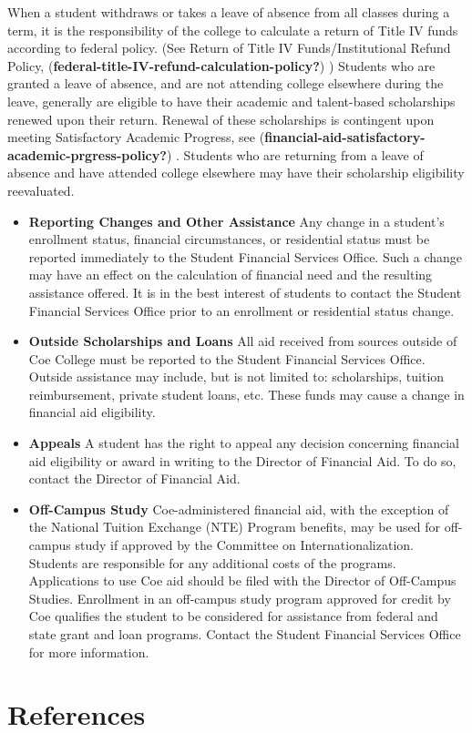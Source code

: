 \documentclass[
  letterpaper,
]{scrbook}
\newlength{\cslhangindent}
\newlength{\cslentryspacingunit} %
\newenvironment{CSLReferences}[2] %
 {%
  \setlength{\parindent}{0pt}
  \ifodd #1
  \let\oldpar\par
  \def\par{\hangindent=\cslhangindent\oldpar}
  \fi
  \setlength{\parskip}{#2\cslentryspacingunit}
 }%
 {}
\begin{document}
When a student withdraws or takes a leave of absence from all classes
during a term, it is the responsibility of the college to calculate a
return of Title IV funds according to federal policy. (See Return of
Title IV Funds/Institutional Refund Policy,
(\textbf{federal-title-IV-refund-calculation-policy?}) ) Students who
are granted a leave of absence, and are not attending college elsewhere
during the leave, generally are eligible to have their academic and
talent-based scholarships renewed upon their return. Renewal of these
scholarships is contingent upon meeting Satisfactory Academic Progress,
see (\textbf{financial-aid-satisfactory-academic-prgress-policy?}) .
Students who are returning from a leave of absence and have attended
college elsewhere may have their scholarship eligibility reevaluated.

\begin{itemize}
\item
  \textbf{Reporting Changes and Other Assistance} Any change in a
  student's enrollment status, financial circumstances, or residential
  status must be reported immediately to the Student Financial Services
  Office. Such a change may have an effect on the calculation of
  financial need and the resulting assistance offered. It is in the best
  interest of students to contact the Student Financial Services Office
  prior to an enrollment or residential status change.
\item
  \textbf{Outside Scholarships and Loans} All aid received from sources
  outside of Coe College must be reported to the Student Financial
  Services Office. Outside assistance may include, but is not limited
  to: scholarships, tuition reimbursement, private student loans, etc.
  These funds may cause a change in financial aid eligibility.
\item
  \textbf{Appeals} A student has the right to appeal any decision
  concerning financial aid eligibility or award in writing to the
  Director of Financial Aid. To do so, contact the Director of Financial
  Aid.
\item
  \textbf{Off-Campus Study} Coe-administered financial aid, with the
  exception of the National Tuition Exchange (NTE) Program benefits, may
  be used for off-campus study if approved by the Committee on
  Internationalization. Students are responsible for any additional
  costs of the programs. Applications to use Coe aid should be filed
  with the Director of Off-Campus Studies. Enrollment in an off-campus
  study program approved for credit by Coe qualifies the student to be
  considered for assistance from federal and state grant and loan
  programs. Contact the Student Financial Services Office for more
  information.
\end{itemize}


\hypertarget{references}{%
\chapter*{References}\label{references}}


\hypertarget{refs}{}
\begin{CSLReferences}{0}{0}
\end{CSLReferences}

\backmatter
\printindex
\end{document}
